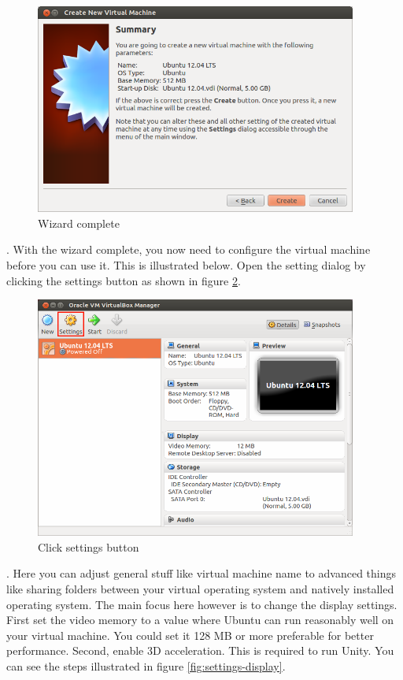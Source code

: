 \begin{figure}[!h]	
	\centering
	\includegraphics[width=300pt]{./images/installation/virtualbox/Wizard-complete.png}
	\caption{Wizard complete}	
	\label{fig:Wizard-complete}	
\end{figure}

\newpage
\par {}. With the wizard complete, you now need to configure the virtual machine before you can use it. This is illustrated below. Open the setting dialog by clicking the settings button as shown in figure \ref{fig:wizard-final}. \\

\begin{figure}[!h]	
	\centering
	\includegraphics[width=300pt]{./images/installation/virtualbox/wizard-final.png}
	\caption{Click settings button}	
	\label{fig:wizard-final}	
\end{figure}

\par {}. Here you can adjust general stuff like virtual machine name to advanced things like sharing folders between your virtual operating system and natively installed operating system. The main focus here however is to change the display settings. First set the video memory to a value where Ubuntu can run reasonably well on your virtual machine. You could set it 128 MB or more preferable for better performance. Second, enable 3D acceleration. This is required to run Unity. You can see the steps illustrated in figure \ref{fig:settings-display}. \\


